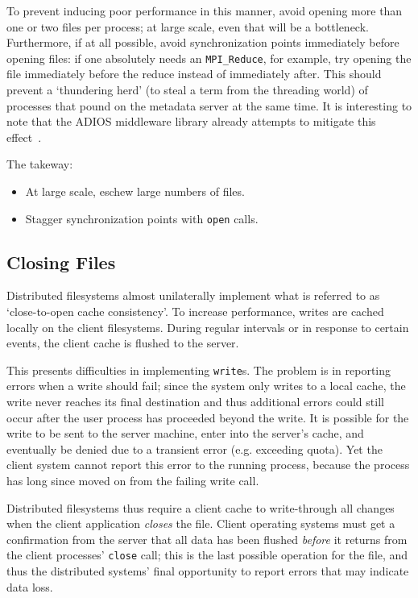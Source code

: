 To prevent inducing poor performance in this manner, avoid opening
more than one or two files per process; at large scale,
even that will be a bottleneck.  Furthermore, if at all possible,
avoid synchronization points immediately before opening files: if one
absolutely needs an \verb!MPI_Reduce!, for example, try opening the
file immediately before the reduce instead of immediately after.  This
should prevent a `thundering herd' (to steal a term from the threading
world) of processes that pound on the metadata server at the same
time.  It is interesting to note that the ADIOS middleware library
already attempts to mitigate this effect~\cite{ADIOS:Manual}.

The takeway:

\begin{itemize}
  \item At large scale, eschew large numbers of files.
  \item Stagger synchronization points with \verb!open! calls.
\end{itemize}

\subsection{Closing Files}

Distributed filesystems almost unilaterally implement what is referred
to as `close-to-open cache consistency'.  To increase performance,
writes are cached locally on the client filesystems.  During regular
intervals or in response to certain events, the client cache is flushed
to the server.

This presents difficulties in implementing \verb!write!s.  The problem
is in reporting errors when a write should fail; since the system only
writes to a local cache, the write never reaches its final destination
and thus additional errors could still occur after the user process has
proceeded beyond the write.  It is possible for the write to be sent to
the server machine, enter into the server's cache, and eventually be
denied due to a transient error (e.g. exceeding quota).  Yet the client
system cannot report this error to the running process, because the
process has long since moved on from the failing write call.

Distributed filesystems thus require a client cache to write-through
all changes when the client application \emph{closes} the file.  Client
operating systems must get a confirmation from the server that all data
has been flushed
\emph{before} it returns from the client processes' \verb!close!
call; this is the last possible operation for the file, and thus the
distributed systems' final opportunity to report errors that may
indicate data loss.

